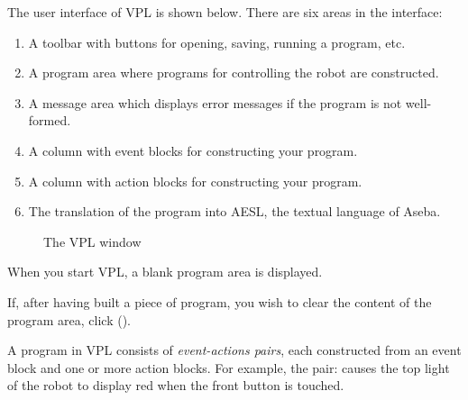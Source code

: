\newpage


The user interface of VPL is shown below.
There are six areas in the interface:
\begin{enumerate}
\item A toolbar with buttons for opening, saving, running a program, etc.
\item A program area where programs for controlling the robot are constructed.
\item A message area which displays error messages if the program is not
well-formed.
\item A column with event blocks for constructing your program.
\item A column with action blocks for constructing your program.
\item The translation of the program into AESL, the textual language of Aseba.
\end{enumerate}

\plainfloat
\begin{figure}[h]
\caption{The VPL window}\label{fig.vplgui}
\end{figure}
\framedfloat

\bigskip


\newpage


When you start VPL, a blank program area is displayed.

If, after having built a piece of program, you wish to clear the content
of the program area, click  ().

A program in VPL consists of \emph{event-actions pairs}, each
constructed from an event block and one or more action blocks. For
example, the pair:  causes the top light of the robot to
display red when the front button is touched.



